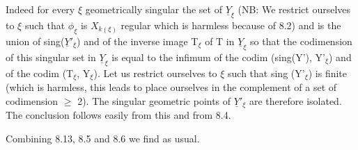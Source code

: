 Indeed for every $\xi$ geometrically singular the set of $\underline{Y}_\xi$
(NB:  We restrict ourselves to $\xi$ such that $\phi_\xi$ is $X_{k(\xi)}$ regular which
is harmless because of 8.2) and is the union of sing($\underline{Y}'_\xi$) and of
the inverse image T$_\xi$ of T in $\underline{Y}_\xi$ so that the codimension of this
singular set in $\underline{Y}_\xi$ is equal to the infimum of the codim (sing(Y'),
Y'$_\xi$) and of the codim (T$_\xi$, Y$_\xi$).  Let us restrict ourselves to $\xi$ such
that sing (Y'$_\xi$) is finite (which is harmless, this leads to place
ourselves in the complement of a set of codimension $\geq$ 2).  The
singular geometric points of $\underline{Y}'_\xi$ are therefore isolated.  The
conclusion follows easily from this and from 8.4.

Combining 8.13, 8.5 and 8.6 we find as usual.


